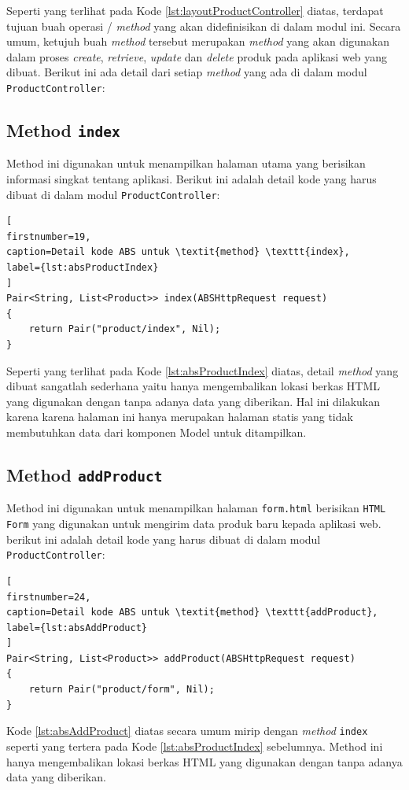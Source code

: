 Seperti yang terlihat pada Kode \ref{lst:layoutProductController} diatas, terdapat tujuan buah operasi / \textit{method} yang akan didefinisikan di dalam modul ini. Secara umum, ketujuh buah \textit{method} tersebut merupakan \textit{method} yang akan digunakan dalam proses \textit{create}, \textit{retrieve}, \textit{update} dan \textit{delete} produk pada aplikasi web yang dibuat. Berikut ini ada detail dari setiap \textit{method} yang ada di dalam modul \texttt{ProductController}:

\subsection{Method \texttt{index}}
Method ini digunakan untuk menampilkan halaman utama yang berisikan informasi singkat tentang aplikasi. Berikut ini adalah detail kode yang harus dibuat di dalam modul \texttt{ProductController}:

\begin{lstlisting}[
firstnumber=19,
caption=Detail kode ABS untuk \textit{method} \texttt{index},
label={lst:absProductIndex}
]
Pair<String, List<Product>> index(ABSHttpRequest request)
{
	return Pair("product/index", Nil);
}
\end{lstlisting}

Seperti yang terlihat pada Kode \ref{lst:absProductIndex} diatas, detail \textit{method} yang dibuat sangatlah sederhana yaitu hanya mengembalikan lokasi berkas HTML yang digunakan dengan tanpa adanya data yang  diberikan. Hal ini dilakukan karena karena halaman ini hanya merupakan halaman statis yang tidak membutuhkan data dari komponen Model untuk ditampilkan.

\subsection{Method \texttt{addProduct}}
Method ini digunakan untuk menampilkan halaman \texttt{form.html} berisikan \texttt{HTML Form} yang digunakan untuk mengirim data produk baru kepada aplikasi web. berikut ini adalah detail kode yang harus dibuat di dalam modul \texttt{ProductController}:

\begin{lstlisting}[
firstnumber=24,
caption=Detail kode ABS untuk \textit{method} \texttt{addProduct},
label={lst:absAddProduct}
]
Pair<String, List<Product>> addProduct(ABSHttpRequest request)
{
	return Pair("product/form", Nil);
}
\end{lstlisting}

Kode \ref{lst:absAddProduct} diatas secara umum mirip dengan \textit{method} \texttt{index} seperti yang tertera pada Kode \ref{lst:absProductIndex} sebelumnya. Method ini hanya mengembalikan lokasi berkas HTML yang digunakan dengan tanpa adanya data yang diberikan. 

